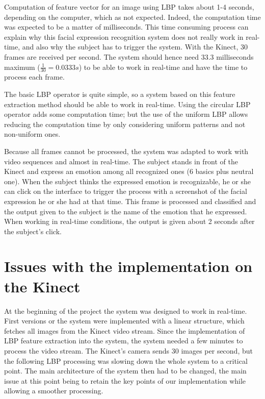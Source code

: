 \vspace{\baselineskip}
\noindent Computation of feature vector for an image using LBP takes about 1-4 seconds, depending on the computer, which as not expected. Indeed, the computation time was expected to be a matter of milliseconds. This time consuming process can explain why this facial expression recognition system does not really work in real-time, and also why the subject has to trigger the system. With the Kinect, 30 frames are received per second. The system should hence need 33.3 milliseconds maximum ($ \frac{1}{30} = 0.0333 s $) to be able to work in real-time and have the time to process each frame. 
\newline

\noindent The basic LBP operator is quite simple, so a system based on this feature extraction method should be able to work in real-time. Using the circular LBP operator adds some computation time; but the use of the uniform LBP allows reducing the computation time by only considering uniform patterns and not non-uniform ones.
\newline

\noindent Because all frames cannot be processed, the system was adapted to work with video sequences and almost in real-time. The subject stands in front of the Kinect and express an emotion among all recognized ones (6 basics plus neutral one). When the subject thinks the expressed emotion is recognizable, he or she can click on the interface to trigger the process with a screenshot of the facial expression he or she had at that time. This frame is processed and classified and the output given to the subject is the name of the emotion that he expressed. When working in real-time conditions, the output is given about 2 seconds after the subject's click.
\newline

\section{Issues with the implementation on the Kinect}
\vspace{\baselineskip}

\noindent At the beginning of the project the system was designed to work in real-time. First versions or the system were implemented with a linear structure, which fetches all images from the Kinect video stream. Since the implementation of LBP feature extraction into the system, the system needed a few minutes to process the video stream. The Kinect's camera sends 30 images per second, but the following LBP processing was slowing down the whole system to a critical point. The main architecture of the system then had to be changed, the main issue at this point being to retain the key points of our implementation while allowing a smoother processing. 
\newline

